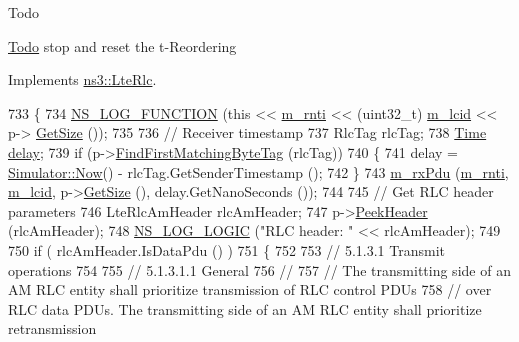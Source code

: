 \begin{DoxyRefDesc}{Todo}
\item[\hyperlink{todo__todo000093}{Todo}]stop and reset the t-\/\+Reordering \end{DoxyRefDesc}


Implements \hyperlink{classns3_1_1LteRlc_af2e315f4fe83d8d8f970832055a784d3}{ns3\+::\+Lte\+Rlc}.


\begin{DoxyCode}
733 \{
734   \hyperlink{log-macros-disabled_8h_a90b90d5bad1f39cb1b64923ea94c0761}{NS\_LOG\_FUNCTION} (\textcolor{keyword}{this} << \hyperlink{classns3_1_1LteRlc_a48ab0a78e7f2687337075b1c8832df70}{m\_rnti} << (uint32\_t) \hyperlink{classns3_1_1LteRlc_a051085e9b27883e7ba4b98ad7242fd8a}{m\_lcid} << p->
      \hyperlink{classns3_1_1Packet_a462855c9929954d4301a4edfe55f4f1c}{GetSize} ());
735 
736   \textcolor{comment}{// Receiver timestamp}
737   RlcTag rlcTag;
738   \hyperlink{namespacens3_1_1TracedValueCallback_a7ffd3e7c142ffe7c8a1d2db9b8de38ec}{Time} \hyperlink{lte_2model_2fading-traces_2fading__trace__generator_8m_a7964e6aa8f61a9d28973c8267a606ad8}{delay};
739   \textcolor{keywordflow}{if} (p->\hyperlink{classns3_1_1Packet_a2e1403c2411495827012fe000823c16a}{FindFirstMatchingByteTag} (rlcTag))
740     \{
741       delay = \hyperlink{classns3_1_1Simulator_ac3178fa975b419f7875e7105be122800}{Simulator::Now}() - rlcTag.GetSenderTimestamp ();
742     \}
743   \hyperlink{classns3_1_1LteRlc_a5a2491726597ab3cb02655b34dca0722}{m\_rxPdu} (\hyperlink{classns3_1_1LteRlc_a48ab0a78e7f2687337075b1c8832df70}{m\_rnti}, \hyperlink{classns3_1_1LteRlc_a051085e9b27883e7ba4b98ad7242fd8a}{m\_lcid}, p->\hyperlink{classns3_1_1Packet_a462855c9929954d4301a4edfe55f4f1c}{GetSize} (), delay.GetNanoSeconds ());
744 
745   \textcolor{comment}{// Get RLC header parameters}
746   LteRlcAmHeader rlcAmHeader;
747   p->\hyperlink{classns3_1_1Packet_aadc63487bea70945c418f4c3e9b81964}{PeekHeader} (rlcAmHeader);
748   \hyperlink{group__logging_ga88acd260151caf2db9c0fc84997f45ce}{NS\_LOG\_LOGIC} (\textcolor{stringliteral}{"RLC header: "} << rlcAmHeader);
749 
750   \textcolor{keywordflow}{if} ( rlcAmHeader.IsDataPdu () )
751     \{
752 
753       \textcolor{comment}{// 5.1.3.1   Transmit operations}
754 
755       \textcolor{comment}{// 5.1.3.1.1       General}
756       \textcolor{comment}{//}
757       \textcolor{comment}{// The transmitting side of an AM RLC entity shall prioritize transmission of RLC control PDUs}
758       \textcolor{comment}{// over RLC data PDUs. The transmitting side of an AM RLC entity shall prioritize retransmission}

\end{DoxyCode}
